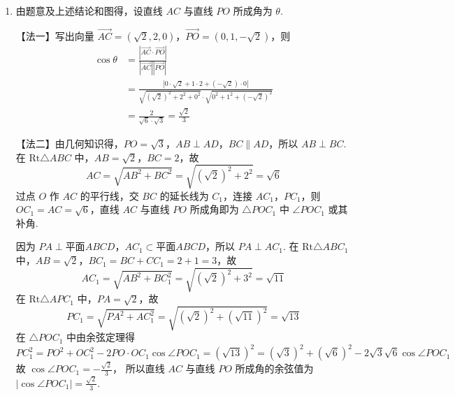 \begin{solution}
\begin{enumerate}
\begin{enumerate}
由几何知识得
\(O_1E = AB = \sqrt{2}\)，\(BE = CE = AO_1 = \frac{1}{2} BC = 1\)，\(O_1D = AD - AO_1 = \sqrt{3}\)，
并且
\(BO_1 = CO_1 = \sqrt{1^2 + (\sqrt{2})^2} = \sqrt{3}\)，\(O_1D = BO_1 = CO_1\)，
所以点 \(O_1\) 是 \(\triangle BCD\) 的外心.


在 \(\mathrm{Rt} \triangle AOP\) 中，\(AP \perp AD\)，\(AP = \sqrt{2}\)，故
\[
PO_1 = \sqrt{AP^2 + AO_1^2} = \sqrt{(\sqrt{2})^2 + 1^2} = \sqrt{3}
\]
从而
\[
PO_1 = BO_1 = CO_1 = O_1 D = \sqrt{3}
\]
点 \(O_1\) 即为点 \(P\)，\(B\)，\(C\)，\(D\) 所在球的球心 \(O\). 此时点 \(O\) 在线段 \(AD\) 上，且 \(AD \subset \text{平面} ABCD\)，所以点 \(O\) 在平面 \(ABCD\) 上.

\item 由题意及上述结论和图得，设直线 \(AC\) 与直线 \(PO\) 所成角为 \(\theta\).


【法一】写出向量 \(\overrightarrow{AC} = (\sqrt{2},2,0)\)，\(\overrightarrow{PO} = (0,1,-\sqrt{2})\)，则
\begin{align*}
\cos\theta
&= \frac{|\overrightarrow{AC}\cdot\overrightarrow{PO}|}{|\overrightarrow{AC}||\overrightarrow{PO}|}\\
&= \frac{|0\cdot\sqrt{2}+1\cdot 2+(-\sqrt{2})\cdot 0|}{\sqrt{(\sqrt{2})^2+2^2+0^2}\cdot \sqrt{0^2+1^2+(-\sqrt{2})^2}}\\
&= \frac{2}{\sqrt{6}\cdot\sqrt{3}}=\frac{\sqrt{2}}{3}
\end{align*}

【法二】由几何知识得，\(PO = \sqrt{3}\)，\(AB \perp AD\)，\(BC \parallel AD\)，所以 \(AB \perp BC\). 在 \(\mathrm{Rt} \triangle ABC\) 中，\(AB = \sqrt{2}\)，\(BC = 2\)，故
\[
AC = \sqrt{AB^2 + BC^2} = \sqrt{(\sqrt{2})^2 + 2^2} = \sqrt{6}
\]
过点 \(O\) 作 \(AC\) 的平行线，交 \(BC\) 的延长线为 \(C_1\)，连接 \(AC_1\)，\(PC_1\)，则 \(OC_1 = AC = \sqrt{6}\)，直线 \(AC\) 与直线 \(PO\) 所成角即为 \(\triangle POC_1\) 中 \(\angle POC_1\) 或其补角.


因为 \(PA \perp \text{平面} ABCD\)，\(AC_1 \subset \text{平面} ABCD\)，所以 \(PA \perp AC_1\). 在 \(\mathrm{Rt} \triangle ABC_1\) 中，\(AB = \sqrt{2}\)，\(BC_1 = BC + CC_1 = 2 + 1 = 3\)，故
\[
AC_1 = \sqrt{AB^2 + BC_1^2} = \sqrt{(\sqrt{2})^2 + 3^2} = \sqrt{11}
\]
在 \(\mathrm{Rt} \triangle APC_1\) 中，\(PA = \sqrt{2}\)，故
\[
PC_1 = \sqrt{PA^2 + AC_1^2} = \sqrt{(\sqrt{2})^2 + (\sqrt{11})^2} = \sqrt{13}
\]
在 \(\triangle POC_1\) 中由余弦定理得
\[
PC_1^2 = PO^2 + OC_1^2 - 2PO \cdot OC_1 \cos \angle POC_1 =(\sqrt{13})^2 = (\sqrt{3})^2 + (\sqrt{6})^2 - 2\sqrt{3}\sqrt{6}\cos \angle POC_1
\]
故
\(\cos \angle POC_1 = -\frac{\sqrt{2}}{3}\)，
所以直线 \(AC\) 与直线 \(PO\) 所成角的余弦值为
\(|\cos \angle POC_1| = \frac{\sqrt{2}}{3}\).
\end{enumerate}
\end{enumerate}
\end{solution}

